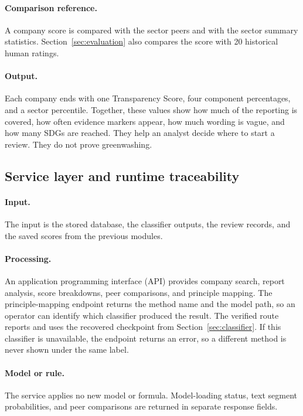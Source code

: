 \paragraph{Comparison reference.} A company score is compared with the sector peers and with the sector summary statistics. Section~\ref{sec:evaluation} also compares the score with 20 historical human ratings.

\paragraph{Output.} Each company ends with one Transparency Score, four component percentages, and a sector percentile. Together, these values show how much of the reporting is covered, how often evidence markers appear, how much wording is vague, and how many SDGs are reached. They help an analyst decide where to start a review. They do not prove greenwashing.

\subsection{Service layer and runtime traceability}
\label{sec:api}

\paragraph{Input.} The input is the stored database, the classifier outputs, the review records, and the saved scores from the previous modules.

\paragraph{Processing.} An application programming interface (API) provides company search, report analysis, score breakdowns, peer comparisons, and principle mapping. The principle-mapping endpoint returns the method name and the model path, so an operator can identify which classifier produced the result. The verified route reports  and uses the recovered checkpoint from Section~\ref{sec:classifier}. If this classifier is unavailable, the endpoint returns an error, so a different method is never shown under the same label.

\paragraph{Model or rule.} The service applies no new model or formula. Model-loading status, text segment probabilities, and peer comparisons are returned in separate response fields.

